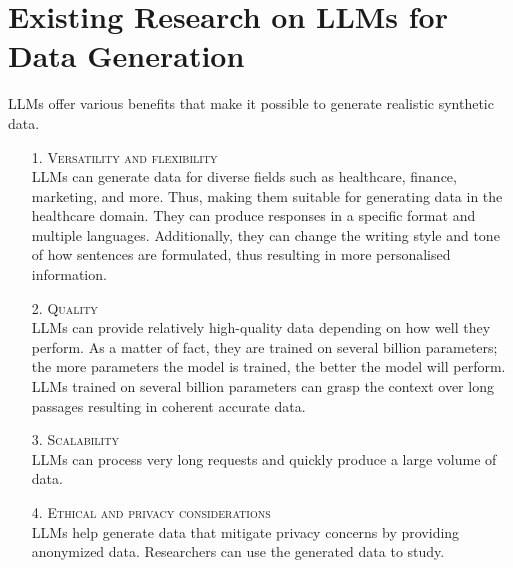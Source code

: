 \section{Existing Research on LLMs for Data Generation}
\label{sec:ExisitingResearchLLMs}


LLMs offer various benefits that make it possible to generate realistic synthetic data. 

\begin{itemize}
    \item[1.] \textsc{Versatility and flexibility}\\
    LLMs can generate data for diverse fields such as healthcare, finance, marketing, and more. Thus, making them suitable for generating data in the healthcare domain. They can produce responses in a specific format and multiple languages. Additionally, they can change the writing style and tone of how sentences are formulated, thus resulting in more personalised information.

    \item[2.] \textsc{Quality}\\
    LLMs can provide relatively high-quality data depending on how well they perform. As a matter of fact, they are trained on several billion parameters; the more parameters the model is trained, the better the model will perform. LLMs trained on several billion parameters can grasp the context over long passages resulting in coherent accurate data. 

    \item[3.] \textsc{Scalability}\\
    LLMs can process very long requests and quickly produce a large volume of data. 

    \item[4.] \textsc{Ethical and privacy considerations}\\
    LLMs help generate data that mitigate privacy concerns by providing anonymized data. Researchers can use the generated data to study.

\end{itemize}
